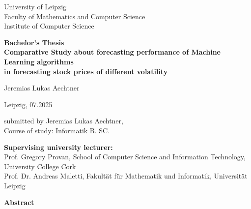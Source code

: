 \documentclass[a4paper,12pt]{report}
\begin{document}
\thispagestyle{empty}

\begin{center}
  \large
University of Leipzig\\
Faculty of Mathematics and Computer Science\\[0.3cm]
Institute of Computer Science
\end{center}

\vspace{3cm}

\begin{center}
  \LARGE\bfseries
  Bachelor's Thesis\\[1cm]
  Comparative Study about forecasting performance of Machine Learning algorithms\\
  in forecasting stock prices of different volatility
\end{center}

\vspace{3cm}

\begin{center}
  \large
  Jeremias Lukas Aechtner
\end{center}

\vfill

\noindent
\begin{minipage}[t]{0.5\textwidth}
  Leipzig, 07.2025
\end{minipage}%
\begin{minipage}[t]{0.5\textwidth}
  \raggedleft
  submitted by Jeremias Lukas Aechtner,\\
  Course of study: Informatik B. SC.
\end{minipage}

\vspace{2cm}

\noindent
\begin{minipage}[t]{\textwidth}
  \small
  \textbf{Supervising university lecturer:}\\
  Prof. Gregory Provan, School of Computer Science and Information Technology, University College Cork\\
  Prof. Dr. Andreas Maletti, Fakultät für Mathematik und Informatik, Universität Leipzig
\end{minipage}


\newpage
\vspace*{\fill}

{\fontsize{20}{23}\selectfont\textbf{Abstract}}\\\\\\\\
\end{document}
